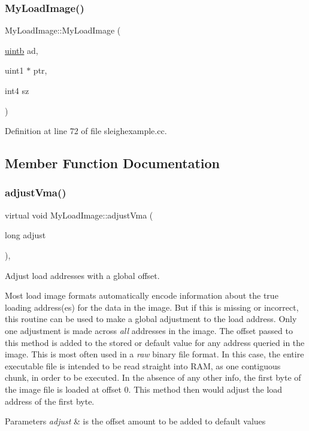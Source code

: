\subsubsection{\texorpdfstring{MyLoadImage()}{MyLoadImage()}}
{\footnotesize\ttfamily My\+Load\+Image\+::\+My\+Load\+Image (\begin{DoxyParamCaption}\item[{\mbox{\hyperlink{types_8h_a2db313c5d32a12b01d26ac9b3bca178f}{uintb}}}]{ad,  }\item[{uint1 $\ast$}]{ptr,  }\item[{int4}]{sz }\end{DoxyParamCaption})\hspace{0.3cm}{\ttfamily [inline]}}



Definition at line 72 of file sleighexample.\+cc.



\subsection{Member Function Documentation}
\mbox{\label{class_my_load_image_aa395d2908f2d6d61295ce0d5995838a9}} 
\subsubsection{\texorpdfstring{adjustVma()}{adjustVma()}}
{\footnotesize\ttfamily virtual void My\+Load\+Image\+::adjust\+Vma (\begin{DoxyParamCaption}\item[{long}]{adjust }\end{DoxyParamCaption})\hspace{0.3cm}{\ttfamily [inline]}, {\ttfamily [virtual]}}



Adjust load addresses with a global offset. 

Most load image formats automatically encode information about the true loading address(es) for the data in the image. But if this is missing or incorrect, this routine can be used to make a global adjustment to the load address. Only one adjustment is made across {\itshape all} addresses in the image. The offset passed to this method is added to the stored or default value for any address queried in the image. This is most often used in a {\itshape raw} binary file format. In this case, the entire executable file is intended to be read straight into R\+AM, as one contiguous chunk, in order to be executed. In the absence of any other info, the first byte of the image file is loaded at offset 0. This method then would adjust the load address of the first byte. 
\begin{DoxyParams}{Parameters}
{\em adjust} & is the offset amount to be added to default values \\
\hline
\end{DoxyParams}


